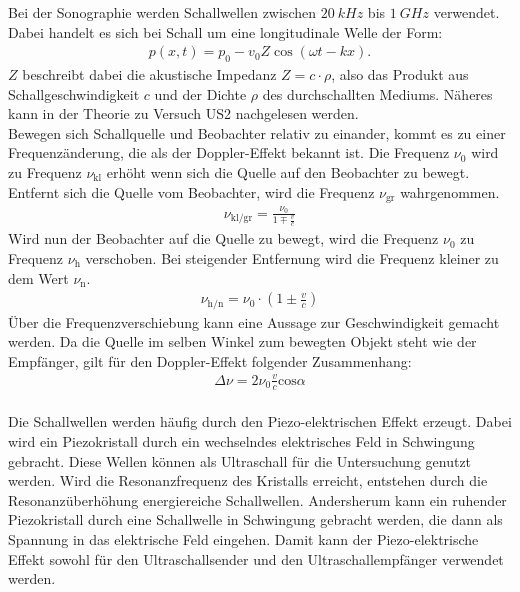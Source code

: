 Bei der Sonographie werden Schallwellen zwischen $\SI{20}{kHz}$ bis $\SI{1}{GHz}$ verwendet.
Dabei handelt es sich bei Schall um eine longitudinale Welle der Form:
\begin{align*}
  p(x, t)= p_{\text{0}}-v_{\text{0}}Z \cos{(\omega t -k x)}.
\end{align*}
$Z$ beschreibt dabei die akustische Impedanz $Z=c \cdot \rho$, also das Produkt aus Schallgeschwindigkeit $c$ und der Dichte $\rho$ des durchschallten Mediums.
Näheres kann in der Theorie zu Versuch US2 nachgelesen werden.\\
Bewegen sich Schallquelle und Beobachter relativ zu einander, kommt es zu einer Frequenzänderung, die als der Doppler-Effekt bekannt ist.
Die Frequenz $\nu_0$ wird zu Frequenz $\nu_{\text{kl}}$ erhöht wenn sich die Quelle auf den Beobachter zu bewegt.
Entfernt sich die Quelle vom Beobachter, wird die Frequenz $\nu_{\text{gr}}$ wahrgenommen.
\begin{align*}
  \nu_{\text{kl/gr}}=\frac{\nu_0}{1\mp\frac{v}{c}}
\end{align*}
Wird nun der Beobachter auf die Quelle zu bewegt, wird die Frequenz $\nu_0$ zu Frequenz $\nu_{\text{h}}$ verschoben.
Bei steigender Entfernung wird die Frequenz kleiner zu dem Wert $\nu_{\text{n}}$.
\begin{align*}
  \nu_{\text{h/n}}=\nu_0\cdot\left(1\pm\frac{v}{c}\right)
\end{align*}
Über die Frequenzverschiebung kann eine Aussage zur Geschwindigkeit gemacht werden.
Da die Quelle im selben Winkel zum bewegten Objekt steht wie der Empfänger, gilt für den Doppler-Effekt folgender Zusammenhang:
\begin{align}
  \Delta \nu = 2 \nu_0 \frac{v}{c}  \text{cos} \alpha
  \label{eqn:v}
\end{align}
\\ Die Schallwellen werden häufig durch den Piezo-elektrischen Effekt erzeugt.
Dabei wird ein Piezokristall durch ein wechselndes elektrisches Feld in Schwingung gebracht.
Diese Wellen können als Ultraschall für die Untersuchung genutzt werden.
Wird die Resonanzfrequenz des Kristalls erreicht, entstehen durch die Resonanzüberhöhung energiereiche Schallwellen.
Andersherum kann ein ruhender Piezokristall durch eine Schallwelle in Schwingung gebracht werden,
die dann als Spannung in das elektrische Feld eingehen.
Damit kann der Piezo-elektrische Effekt sowohl für den Ultraschallsender und den Ultraschallempfänger verwendet werden.
